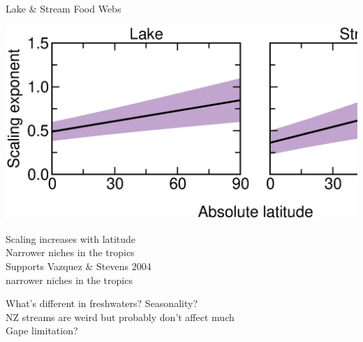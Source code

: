 \documentclass{beamer}
\begin{document}
  \begin{frame}{Lake \& Stream Food Webs}
    \begin{center}
      \includegraphics*[width=.8\textwidth]{Figures/results/effect.eps}

      \vspace{1cm}
      Scaling increases with latitude\\
      Narrower niches in the tropics\\
      Supports Vazquez \& Stevens 2004\\
      {\color{white} narrower niches in the tropics}

    \end{center}
  \end{frame}


  \begin{frame}{What's different in freshwaters?}
    Seasonality?\\
    NZ streams are weird but probably don't affect much\\
    Gape limitation?\\
  \end{frame}
\end{document}
